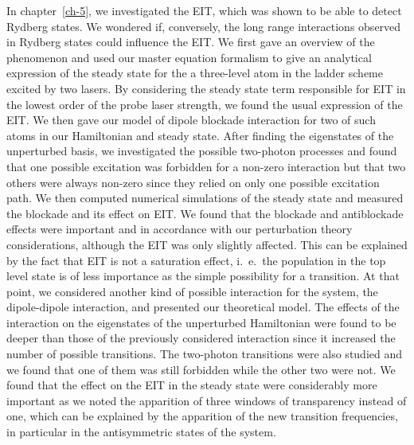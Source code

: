 In chapter~\ref{ch-5}, we investigated the EIT, which was shown to be able to detect Rydberg states. We wondered if, conversely, the long range interactions observed in Rydberg states could influence the EIT. We first gave an overview of the phenomenon and used our master equation formalism to give an analytical expression of the steady state for the a three-level atom in the ladder scheme excited by two lasers. By considering the steady state term responsible for EIT in the lowest order of the probe laser strength, we found the usual expression of the EIT. We then gave our model of dipole blockade interaction for two of such atoms in our Hamiltonian and steady state. After finding the eigenstates of the unperturbed basis, we investigated the possible two-photon processes and found that one possible excitation was forbidden for a non-zero interaction but that two others were always non-zero since they relied on only one possible excitation path. We then computed numerical simulations of the steady state and measured the blockade and its effect on EIT. We found that the blockade and antiblockade effects were important and in accordance with our perturbation theory considerations, although the EIT was only slightly affected. This can be explained by the fact that EIT is not a saturation effect, i.~e.~the population in the top level state is of less importance as the simple possibility for a  transition. At that point, we considered another kind of possible interaction for the system, the dipole-dipole interaction, and presented our theoretical model. The effects of the interaction on the eigenstates of the unperturbed Hamiltonian were found to be deeper than those of the previously considered interaction since it increased the number of possible transitions. The two-photon transitions were also studied and we found that one of them was still forbidden while the other two were not. We found that the effect on the EIT in the steady state were considerably more important as we noted the apparition of three windows of transparency instead of one, which can be explained by the apparition of the new transition frequencies, in particular in the antisymmetric states of the system.

